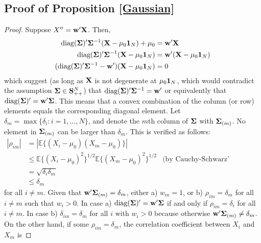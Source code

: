 \documentclass[11pt]{article}
\newcommand{\E}{\mathbb{E}}
\theoremstyle{definition}
\theoremstyle{definition}
\def\one{{\bf 1}}
\def\bSigma{{\bf \Sigma}}
\def\w{{\bf w}}
\def\X{{\bf X}}
\def\SS{{\bf S}}
\def\E{{\mathbb E}}
\def\diag{\text{diag}}
\def\diag{\text{diag}}
\begin{document}
\subsection{Proof of Proposition \ref{Gaussian}}
\begin{proof}
Suppose $X'' = \w' \X$. Then, 
\begin{align*}
\diag(\bSigma)'\bSigma^{-1}(\X-\mu_0\one_N) + \mu_0 &= \w' \X\\
\diag(\bSigma)'\bSigma^{-1}(\X-\mu_0\one_N) &= \w' (\X - \mu_0 \one_N)\\
( \diag(\bSigma)'\bSigma^{-1} - \w' ) (\X-\mu_0\one_N) &= 0
\end{align*}
which suggest (as long as $\X$ is not degenerate at $\mu_0\one_N$, which would contradict the assumption $\bSigma \in \SS_{++}^N$) that $\diag(\bSigma)'\bSigma^{-1} = \w'$ or equivalently that $\diag(\bSigma)' = \w'\bSigma$. This means that a convex combination of the column (or row) elements equals the corresponding diagonal element. Let $\delta_{m} = \max \{ \delta_i : i =1, \dots, N\}$, and denote the $m$th column of $\bSigma$ with $\bSigma_{(m)}$.  No element in $\bSigma_{(m)}$ can be larger than $\delta_m$. This is verified as follows:
\begin{align*}
|\rho_{im}| &= |\E\{ (X_i - \mu_0)(X_m - \mu_0) \}| \\
&\leq  \E\{ (X_i - \mu_0)^2 \}^{1/2}\E\{ (X_m - \mu_0)^2 \}^{1/2} & \text{(by Cauchy-Schwarz' inequality)}\\
&=  \sqrt{\delta_i \delta_m}\\
&\leq \delta_m
\end{align*}
for all $i \neq m$. Given that $\w' \bSigma_{(m)} = \delta_m$, either a) $w_m = 1$, or b) $\rho_{im} = \delta_m$ for all $i \neq m$ such that $w_i > 0$. In case a) $\diag(\bSigma)' = \w'\bSigma$ if and only if $\rho_{im} = \delta_i$ for all $i \neq m$. In case b) $\delta_{im} = \delta_m$ for all $i$ with $w_i > 0$ because otherwise  $\w' \bSigma_{(m)} \neq \delta_m$. On the other hand, if some $\rho_{im} = \delta_m$, the correlation coefficient between $X_i$ and $X_m$ is

\end{proof}
\end{document}
